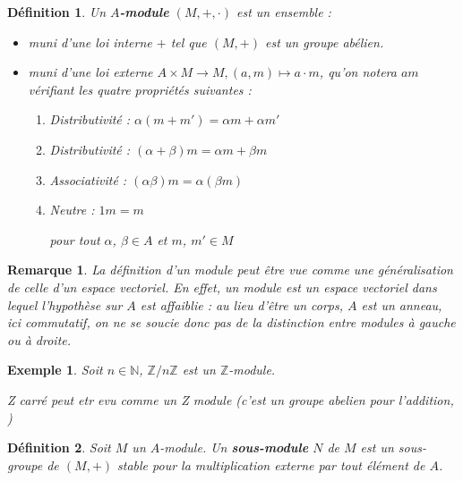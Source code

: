 \documentclass[a4paper,12pt]{report}  %
\theoremstyle{definitionstyle}
\newtheorem{definition}{Définition}[chapter] %
\theoremstyle{examplestyle}
\newtheorem{example}{Exemple}[chapter] %
\theoremstyle{remarkstyle}
\newtheorem{remark}{Remarque}[chapter] %
\theoremstyle{propositionstyle}
\theoremstyle{theoremstyle}
\theoremstyle{proofstyle}
\begin{document}
	\begin{definition}
		Un \textbf{$A$-module} $(M, +, \cdot)$ est un ensemble :
		
		\begin{itemize}
			\item muni d'une loi interne $+$ tel que $(M, +)$ est un groupe abélien.
			\item muni d'une loi externe $A \times M \rightarrow M, (a, m) \mapsto a \cdot m$, qu'on notera $am$ vérifiant les quatre propriétés suivantes :
			\begin{enumerate}
				\item Distributivité : $\alpha(m + m') = \alpha m + \alpha m'$
				\item Distributivité : $(\alpha+\beta)m = \alpha m + \beta m$
				\item Associativité : $(\alpha \beta)m = \alpha(\beta m)$
				\item Neutre : $1m = m$
				
				pour tout $\alpha$, $\beta \in A$ et $m$, $m' \in M$
			\end{enumerate}
		\end{itemize}
	\end{definition}
	
	\begin{remark}
		La définition d'un module peut être vue comme une généralisation de celle d'un espace vectoriel. En effet, un module est un espace vectoriel dans lequel l'hypothèse sur $A$ est affaiblie : au lieu d'être un corps, $A$ est un anneau, ici commutatif, on ne se soucie donc pas de la distinction entre modules à gauche ou à droite.
	\end{remark}

	
	\begin{example}
		Soit $n \in \mathbb{N}$, $\mathbb{Z}/n \mathbb{Z}$ est un $\mathbb{Z}$-module.
		
		Z carré peut etr evu comme un Z module (c'est un groupe abelien pour l'addition, )
	\end{example}

	\begin{definition}
		Soit $M$ un $A$-module. Un \textbf{sous-module} $N$ de $M$ est un sous-groupe de $(M, +)$ stable pour la multiplication externe par tout élément de $A$.
	\end{definition}

	
\end{document}
